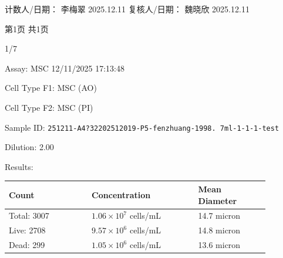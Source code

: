\documentclass[UTF8,10pt,a4paper,fontset=fandol]{ctexart}
\newcommand{\fieldvalue}[1]{#1}
\newcommand{\handwritten}[1]{#1}
\begin{document}
\noindent
计数人/日期：
\fieldvalue{\handwritten{李梅翠}}
\quad
\fieldvalue{\handwritten{2025.12.11}}
\qquad
复核人/日期：
\fieldvalue{\handwritten{魏晓欣}}
\quad
\fieldvalue{\handwritten{2025.12.11}}

\bigskip

\noindent
第1页 共1页

\fieldvalue{\handwritten{1/7}}

\newpage

\noindent
Assay:
\fieldvalue{MSC}
\hfill
\fieldvalue{12/11/2025 17:13:48}

\medskip

\noindent
Cell Type F1:
\fieldvalue{MSC (AO)}

\noindent
Cell Type F2:
\fieldvalue{MSC (PI)}

\medskip

\noindent
Sample ID:
\fieldvalue{\texttt{251211-A4?32202512019-P5-fenzhuang-1998. 7ml-1-1-1-test}}

\noindent
Dilution:
\fieldvalue{2.00}

\medskip
\noindent
Results:

\medskip
\noindent
\begin{tabular}{@{}p{0.28\linewidth}p{0.36\linewidth}p{0.24\linewidth}@{}}
\textbf{Count} & \textbf{Concentration} & \textbf{Mean Diameter} \\
\hline
Total:
\fieldvalue{3007}
&
\fieldvalue{$1.06 \times 10^{7}$ cells/mL}
&
\fieldvalue{14.7 micron}
\\
Live:
\fieldvalue{2708}
&
\fieldvalue{$9.57 \times 10^{6}$ cells/mL}
&
\fieldvalue{14.8 micron}
\\
Dead:
\fieldvalue{299}
&
\fieldvalue{$1.05 \times 10^{6}$ cells/mL}
&
\fieldvalue{13.6 micron}
\end{tabular}
\end{document}
